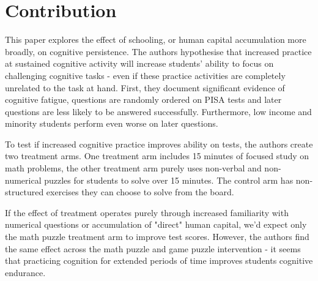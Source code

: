\documentclass{article}
\author{Edward Jee}
\begin{document}
\maketitle

\section{Contribution}





This paper explores the effect of schooling, or human capital accumulation more 
broadly, on cognitive persistence. The authors hypothesise that increased practice 
at sustained cognitive activity will increase students' ability to focus on 
challenging cognitive tasks - even if these practice activities are completely unrelated 
to the task at hand. First, they document significant evidence of cognitive fatigue,
questions are randomly ordered on PISA tests and later questions are less likely 
to be answered successfully. Furthermore, low income and minority students perform 
even worse on later questions.


To test if increased cognitive practice improves ability on tests, the authors 
create two treatment arms. One treatment arm includes 15 minutes of focused study on math 
problems, the other treatment arm purely uses non-verbal and non-numerical 
puzzles for students to solve over 15 minutes. The control arm has non-structured 
exercises they can choose to solve from the board.


If the effect of treatment operates purely through increased familiarity with 
numerical questions or accumulation of "direct" human capital, we'd expect only 
the math puzzle treatment arm to improve test scores. However, the authors find the 
same effect across the math puzzle and game puzzle intervention - it seems that 
practicing cognition for extended periods of time improves students cognitive 
endurance.



    
\end{document}
